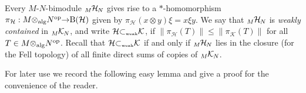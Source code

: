 \documentclass[a4paper,11pt]{amsart}
\numberwithin{equation}{section}
\begin{document}
Every $M$-$N$-bimodule ${\mathord{\raisebox{-0.4ex}[0ex][0ex]{\scriptsize ${M}$}{{\mathcal{H}}}\hspace{-0.2ex}\raisebox{-0.4ex}[0ex][0ex]{\scriptsize ${N}$}}}$ gives rise to a $*$-homomorphism $\pi_{\mathcal{H}} : M {\otimes_{\text{\rm alg}}} N{^\text{\rm op}} {\rightarrow} {\operatorname{B}}({\mathcal{H}})$ given by $\pi_{\mathcal{H}}(x {\otimes} y)\xi = x\xi y$. We say that ${\mathord{\raisebox{-0.4ex}[0ex][0ex]{\scriptsize ${M}$}{{\mathcal{H}}}\hspace{-0.2ex}\raisebox{-0.4ex}[0ex][0ex]{\scriptsize ${N}$}}}$ is \emph{weakly contained} in ${\mathord{\raisebox{-0.4ex}[0ex][0ex]{\scriptsize ${M}$}{\mathcal{K}}\hspace{-0.2ex}\raisebox{-0.4ex}[0ex][0ex]{\scriptsize ${N}$}}}$, and write ${\mathcal{H}} {\subset_{\text{\rm\tiny weak}}} {\mathcal{K}}$, if $\|\pi_{\mathcal{H}}(T)\| {\leqslant} \|\pi_{\mathcal{K}}(T)\|$ for all $T \in M {\otimes_{\text{\rm alg}}} N{^\text{\rm op}}$. Recall that ${\mathcal{H}} {\subset_{\text{\rm\tiny weak}}} {\mathcal{K}}$ if and only if ${\mathord{\raisebox{-0.4ex}[0ex][0ex]{\scriptsize ${M}$}{{\mathcal{H}}}\hspace{-0.2ex}\raisebox{-0.4ex}[0ex][0ex]{\scriptsize ${N}$}}}$ lies in the closure (for the Fell topology) of all finite direct sums of copies of ${\mathord{\raisebox{-0.4ex}[0ex][0ex]{\scriptsize ${M}$}{\mathcal{K}}\hspace{-0.2ex}\raisebox{-0.4ex}[0ex][0ex]{\scriptsize ${N}$}}}$.

For later use we record the following easy lemma and give a proof for the convenience of the reader.
\end{document}
